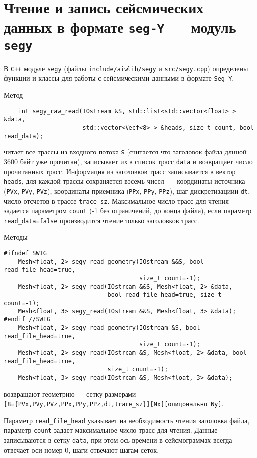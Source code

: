 \section{Чтение и запись сейсмических данных в формате {\tt seg-Y} --- модуль {\tt segy}}
В \verb'C++' модуле \verb'segy' (файлы \verb'include/aiwlib/segy' и \verb'src/segy.cpp')
определены функции и классы для работы с сейсмическими данными в формате \verb'Seg-Y'.

Метод
\begin{verbatim}
    int segy_raw_read(IOstream &S, std::list<std::vector<float> > &data, 
                      std::vector<Vecf<8> > &heads, size_t count, bool read_data);
\end{verbatim}
читает все трассы из входного потока \verb'S' (считается что заголовок файла длиной 3600 байт уже прочитан), записывает их в список трасс \verb'data' и возвращает число
прочитанных трасс.
Информация из заголовков трасс записывается в вектор \verb'heads', для каждой трассы сохраняется восемь чисел~---
координаты источника (\verb'PVx', \verb'PVy', \verb'PVz'), координаты приемника (\verb'PPx', \verb'PPy', \verb'PPz'),
шаг дискретизациии \verb'dt', число отсчетов в трассе \verb'trace_sz'. Максимальное число трасс для чтения задается параметром \verb'count'
(-1 без ограничений, до конца файла), если параметр \verb'read_data=false' производится чтение только заголовков трасс.

Методы
\begin{verbatim}
#ifndef SWIG
    Mesh<float, 2> segy_read_geometry(IOstream &&S, bool read_file_head=true, 
                                      size_t count=-1);
    Mesh<float, 2> segy_read(IOstream &&S, Mesh<float, 2> &data, 
                             bool read_file_head=true, size_t count=-1);
    Mesh<float, 3> segy_read(IOstream &&S, Mesh<float, 3> &data);
#endif //SWIG 
    Mesh<float, 2> segy_read_geometry(IOstream &S, bool read_file_head=true, 
                                      size_t count=-1);
    Mesh<float, 2> segy_read(IOstream &S, Mesh<float, 2> &data, bool read_file_head=true, 
                             size_t count=-1);
    Mesh<float, 3> segy_read(IOstream &S, Mesh<float, 3> &data);
\end{verbatim}
возвращают геометрию --- сетку размерами\\ \verb'[8={PVx,PVy,PVz,PPx,PPy,PPz,dt,trace_sz}][Nx][опицонально Ny]'.

Параметр \verb'read_file_head' указывает на необходимость чтения заголовка файла, параметр \verb'count' задает максимальное число трасс для чтения.
Данные записываются в сетку \verb'data', при этом ось времени в сейсмограммах всегда отвечает оси номер 0, шаги отвечают шагам сеток.


